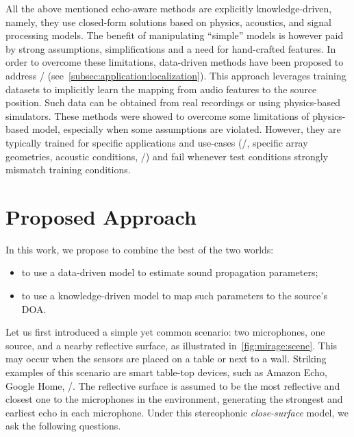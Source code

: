 \mynewline
All the above mentioned echo-aware methods are explicitly knowledge-driven, namely, they use closed-form solutions based on physics, acoustics, and signal processing models.
The benefit of manipulating ``simple'' models is however paid by strong assumptions, simplifications and a need for hand-crafted features.
In order to overcome these limitations, data-driven methods have been proposed to address \SSL/ (see~\cref{subsec:application:localization}).
This approach leverages  training datasets to implicitly learn the mapping from audio features to the source position.
Such data can be obtained from real recordings or using physics-based simulators.
These methods were showed to overcome some limitations of physics-based model, especially when some assumptions are violated.
However, they are typically trained for specific applications and use-cases (\eg/, specific array geometries, acoustic conditions, \etc/) and fail whenever test conditions strongly mismatch training conditions.

\section{Proposed Approach}
In this work, we propose to combine the best of the two worlds:
\begin{itemize}
    \item to use a data-driven model to estimate sound propagation parameters;
    \item to use a knowledge-driven model to map such parameters to the source's \ac{DOA}.
\end{itemize}
Let us first introduced a simple yet common scenario:
two microphones, one source, and a nearby reflective surface, as illustrated in~\cref{fig:mirage:scene}.
This may occur when the sensors are placed on a table or next to a wall.
Striking examples of this scenario are smart table-top devices, such as Amazon Echo, Google Home, \etc/.
The reflective surface is assumed to be the most reflective and closest one to the microphones in the environment, generating the strongest and earliest echo in each microphone.
Under this stereophonic \textit{close-surface} model, we ask the following questions.

